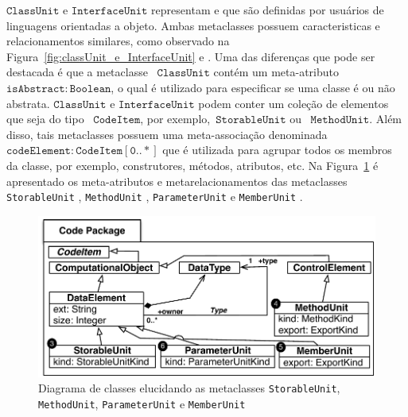 
$\mathtt{ClassUnit}$ e $\mathtt{InterfaceUnit}$ representam  e  que são definidas por usuários de linguagens orientadas a objeto. Ambas metaclasses possuem caracteristicas e relacionamentos similares, como observado na Figura~\ref{fig:classUnit_e_InterfaceUnit}  e . Uma das diferenças que pode ser destacada é que a metaclasse ~$\mathtt{ClassUnit}$ contém um meta-atributo~$\mathtt{isAbstract:Boolean}$, o qual é utilizado para especificar se uma classe é ou não abstrata. $\mathtt{ClassUnit}$ e $\mathtt{InterfaceUnit}$ podem conter um coleção de elementos que seja do tipo ~$\mathtt{CodeItem}$, por exemplo,~$\mathtt{StorableUnit}$ ou ~$\mathtt{MethodUnit}$. Além disso, tais metaclasses  possuem uma meta-associação denominada ~$\mathtt{codeElement:CodeItem[0..*]}$ que é utilizada para agrupar todos os membros da classe, por exemplo, construtores, métodos, atributos, etc. Na Figura~\ref{fig:StorableUnit_MethodUnit} é apresentado os meta-atributos e metarelacionamentos das metaclasses \texttt{StorableUnit} , \texttt{MethodUnit} , \texttt{ParameterUnit}  e \texttt{MemberUnit} .

\begin{figure}[!ht]
	\centering
	\includegraphics[scale=0.8]{images/StorableUnit_MethodUnit2}
	\caption{Diagrama de classes elucidando as metaclasses \texttt{StorableUnit}, \texttt{MethodUnit}, \texttt{ParameterUnit} e \texttt{MemberUnit}}
	\label{fig:StorableUnit_MethodUnit}
\end{figure}


